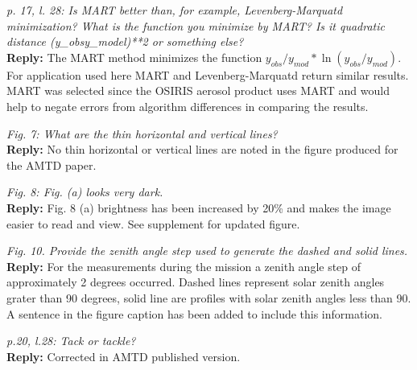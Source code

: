 \documentclass[12pt, notitlepage]{article}
\begin{document}
\hrulefill

\textit{p. 17, l. 28: Is MART better than, for example, Levenberg-Marquatd minimization?
What is the function you minimize by MART? Is it quadratic distance (y\_obsy\_model)**2
or something else?}\\

\textbf{Reply:} The MART method minimizes the function $y_{obs}/y_{mod}*\ln(y_{obs}/y_{mod})$. For application
used here MART and Levenberg-Marquatd return similar results. MART was selected since the OSIRIS aerosol
product uses MART and would help to negate errors from algorithm differences in comparing the results.

\hrulefill

\textit{Fig. 7: What are the thin horizontal and vertical lines?}\\

\textbf{Reply:} No thin horizontal or vertical lines are noted in the figure produced for the AMTD paper.

\hrulefill

\textit{Fig. 8: Fig. (a) looks very dark.}\\

\textbf{Reply:} Fig. 8 (a) brightness has been increased by 20\% and makes the image easier to read and view. See supplement for updated figure.

\hrulefill

\textit{Fig. 10. Provide the zenith angle step used to generate the dashed and solid lines.}\\

\textbf{Reply:} For the measurements during the mission a zenith angle step of approximately 2 degrees occurred.
Dashed lines represent solar zenith angles grater than 90 degrees, solid line are profiles with solar zenith angles less than 90.
A sentence in the figure caption has been added to include this information.

\hrulefill

\textit{p.20, l.28: Tack or tackle?}\\

\textbf{Reply:} Corrected in AMTD published version.

\hrulefill
\end{document}
